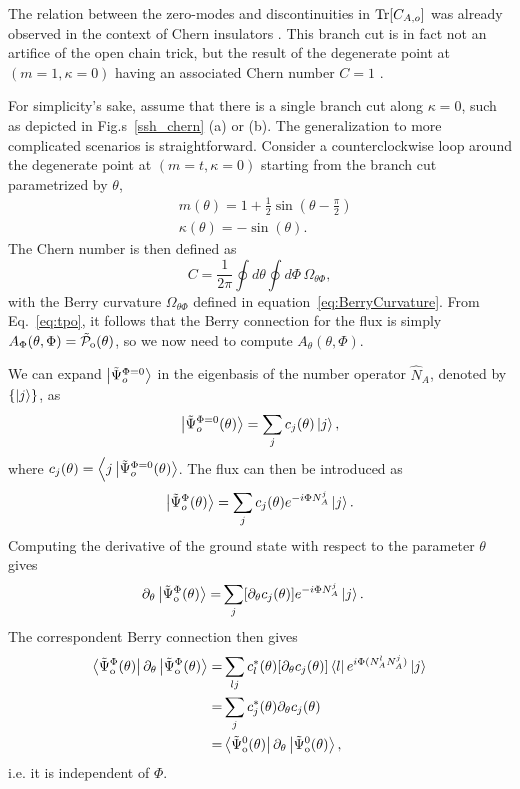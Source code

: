 \documentclass[twocolumn,amsmath,longbibliography,amssymb,superscriptaddress]{revtex4-1}
\newcommand{\tpo}{\tilde{\mathcal{P}}_{\rm o}}
\newcommand{\brapsio}[1]{\bra{\tilde{\Psi}_{{\rm o}}^#1}}
\newcommand{\ketpsio}[1]{\ket{\tilde{\Psi}_{{\rm o}}^#1}}
\begin{document}
The relation between the zero-modes and discontinuities in $\Tr[C_{A,o}]$ was already observed in the context of Chern insulators \cite{Alexandrinata2011}. This branch cut is in fact not an artifice of the open chain trick, but the result of the degenerate point at $(m=1,\kappa=0)$ having an associated Chern number $C=1$ \cite{Asboth2016}.

For simplicity's sake, assume that there is a single branch cut along $\kappa=0$, such as depicted in Fig.s~\ref{ssh_chern} (a) or (b). The generalization to more complicated scenarios is straightforward. 
Consider a counterclockwise loop around the degenerate point at $(m=t,\kappa=0)$ starting from the branch cut parametrized by $\theta$,
\begin{align*}
& m(\theta) = 1+\frac{1}{2}\sin(\theta-\frac{\pi}{2}) \\
& \kappa(\theta) = -\sin(\theta).
\end{align*}
The Chern number is then defined as
\begin{equation}
C = \frac{1}{2\pi}\oint d\theta\oint d\Phi \, \Omega_{\theta\Phi},
\label{eq:chern}
\end{equation} 
with the Berry curvature $\Omega_{\theta\Phi}$ defined in equation~\eqref{eq:BerryCurvature}. 
From  Eq.~\eqref{eq:tpo}, it follows that the Berry connection for the flux is simply $A_\Phi(\theta,\Phi) = \tpo(\theta)$, so we now need to compute $A_\theta(\theta,\Phi)$. 

We can expand $\ket{\tilde{\Psi}^{\Phi = 0}_o}$ in the eigenbasis of the number operator $\hat{N}_A$, denoted by $\{\ket{j}\}$, as
\begin{equation}
\ket{\tilde{\Psi}^{\Phi = 0}_o(\theta)} = \sum_j c_j(\theta)\ket{j},
\end{equation}
where $c_j(\theta) = \Big\langle j\ket{\tilde{\Psi}^{\Phi = 0}_o(\theta)}$. The flux can then be introduced as
\begin{equation}
\ket{\tilde{\Psi}^{\Phi }_o(\theta)} = \sum_j c_j(\theta)e^{-i \Phi N_A^j}\ket{j}.
\end{equation}
Computing the derivative of the ground state with respect to the parameter $\theta$ gives
\begin{align}
\partial_\theta \ketpsio{\Phi(\theta)} =& \sum_j [\partial_\theta c_j (\theta)]e^{-i\Phi N_A^j}\ket{j}.
\end{align}
The correspondent Berry connection then gives
\begin{align}
\brapsio{\Phi(\theta)}\partial_\theta \ketpsio{\Phi(\theta)} =& \sum_{lj} c^*_l(\theta) [\partial_\theta c_j(\theta)] \bra{l} e^{i\Phi (N_A^lN_A^j)}\ket{j}\nonumber\\
=& \sum_j  c^*_j(\theta) \partial_\theta c_j(\theta) \nonumber\\
=&\brapsio{0(\theta)}\partial_\theta \ketpsio{0(\theta)}, 
\end{align}
i.e. it is independent of $\Phi$. 
\end{document}
